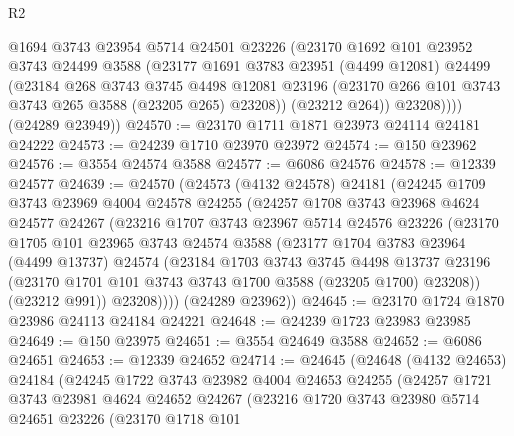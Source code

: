 \begin{lexlean}{R2}
\begin{coremodule}
            @1694
            @3743
            @23954
            @5714
            @24501
            @23226
            (@23170
              @1692
              @101
              @23952
              @3743
              @24499
              @3588
              (@23177
                @1691
                @3783
                @23951
                (@4499 @12081)
                @24499
                (@23184
                  @268
                  @3743
                  @3745
                  @4498
                  @12081
                  @23196
                  (@23170 @266 @101 @3743 @3743 @265 @3588 (@23205 @265) @23208))
                (@23212 @264))
              @23208))))
      (@24289 @23949))
@24570 := @23170 @1711 @1871 @23973 @24114 @24181 @24222
@24573 := @24239 @1710 @23970 @23972
@24574 := @150 @23962
@24576 := @3554 @24574 @3588
@24577 := @6086 @24576
@24578 := @12339 @24577
@24639 := @24570
    (@24573
      (@4132 @24578)
      @24181
      (@24245
        @1709
        @3743
        @23969
        @4004
        @24578
        @24255
        (@24257
          @1708
          @3743
          @23968
          @4624
          @24577
          @24267
          (@23216
            @1707
            @3743
            @23967
            @5714
            @24576
            @23226
            (@23170
              @1705
              @101
              @23965
              @3743
              @24574
              @3588
              (@23177
                @1704
                @3783
                @23964
                (@4499 @13737)
                @24574
                (@23184
                  @1703
                  @3743
                  @3745
                  @4498
                  @13737
                  @23196
                  (@23170 @1701 @101 @3743 @3743 @1700 @3588 (@23205 @1700) @23208))
                (@23212 @991))
              @23208))))
      (@24289 @23962))
@24645 := @23170 @1724 @1870 @23986 @24113 @24184 @24221
@24648 := @24239 @1723 @23983 @23985
@24649 := @150 @23975
@24651 := @3554 @24649 @3588
@24652 := @6086 @24651
@24653 := @12339 @24652
@24714 := @24645
    (@24648
      (@4132 @24653)
      @24184
      (@24245
        @1722
        @3743
        @23982
        @4004
        @24653
        @24255
        (@24257
          @1721
          @3743
          @23981
          @4624
          @24652
          @24267
          (@23216
            @1720
            @3743
            @23980
            @5714
            @24651
            @23226
            (@23170
              @1718
              @101

\end{coremodule}
\end{lexlean}
